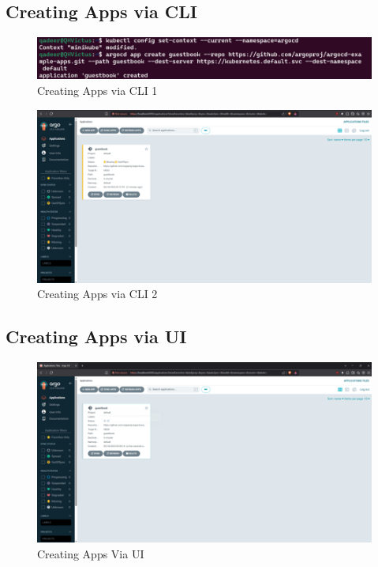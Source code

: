 \documentclass[conference]{IEEEtran}
\begin{document}
\subsection{Creating Apps via CLI}
\begin{figure}[H]
    \centering
    \includegraphics[width=1\linewidth]{Creating Apps via CLI 1.png}
    \caption{Creating Apps via CLI 1}
    \label{fig:creating-apps-via-cli-1}
\end{figure}

\begin{figure}[H]
    \centering
    \includegraphics[width=1\linewidth]{Creating Apps via CLI 2.png}
    \caption{Creating Apps via CLI 2}
    \label{fig:creating-apps-via-cli-2}
\end{figure}

\subsection{Creating Apps via UI}
\begin{figure}[htbp]
    \centering
    \includegraphics[width=1\linewidth]{Creating Apps Via UI.png}
    \caption{Creating Apps Via UI}
    \label{fig:creating-apps-via-UI}
\end{figure}
\end{document}
